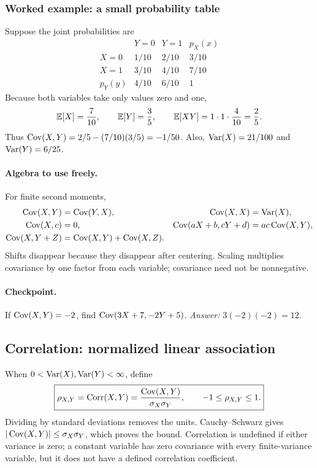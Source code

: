 \subsubsection*{Worked example: a small probability table}
Suppose the joint probabilities are
\[
\begin{array}{c|cc|c}
 &Y=0&Y=1&p_X(x)\\\hline
X=0&1/10&2/10&3/10\\
X=1&3/10&4/10&7/10\\\hline
p_Y(y)&4/10&6/10&1
\end{array}
\]
Because both variables take only values zero and one,
\[
 \mathbb E[X]=\frac7{10},\qquad \mathbb E[Y]=\frac35,\qquad
 \mathbb E[XY]=1\cdot1\cdot\frac4{10}=\frac25.
\]
Thus $\operatorname{Cov}(X,Y)=2/5-(7/10)(3/5)=-1/50$. Also,
$\operatorname{Var}(X)=21/100$ and $\operatorname{Var}(Y)=6/25$.

\paragraph{Algebra to use freely.} For finite second moments,
\[
\begin{aligned}
\operatorname{Cov}(X,Y)&=\operatorname{Cov}(Y,X),&\operatorname{Cov}(X,X)&=\operatorname{Var}(X),\\
\operatorname{Cov}(X,c)&=0,&
\operatorname{Cov}(aX+b,cY+d)&=ac\operatorname{Cov}(X,Y),\\
\operatorname{Cov}(X,Y+Z)&=\operatorname{Cov}(X,Y)+\operatorname{Cov}(X,Z).
\end{aligned}
\]
Shifts disappear because they disappear after centering. Scaling multiplies covariance by one factor from each variable; covariance need not be nonnegative.

\paragraph{Checkpoint.} If $\operatorname{Cov}(X,Y)=-2$, find $\operatorname{Cov}(3X+7,-2Y+5)$. \emph{Answer:} $3(-2)(-2)=12$.

\subsection{Correlation: normalized linear association}
When $0<\operatorname{Var}(X),\operatorname{Var}(Y)<\infty$, define
\[
\boxed{\rho_{X,Y}=\operatorname{Corr}(X,Y)=\frac{\operatorname{Cov}(X,Y)}{\sigma_X\sigma_Y},
 \qquad -1\leq\rho_{X,Y}\leq1.}
\]
Dividing by standard deviations removes the units. Cauchy--Schwarz gives
$|\operatorname{Cov}(X,Y)|\leq\sigma_X\sigma_Y$, which proves the bound. Correlation is undefined if either variance is zero; a constant variable has zero covariance with every finite-variance variable, but it does not have a defined correlation coefficient.

